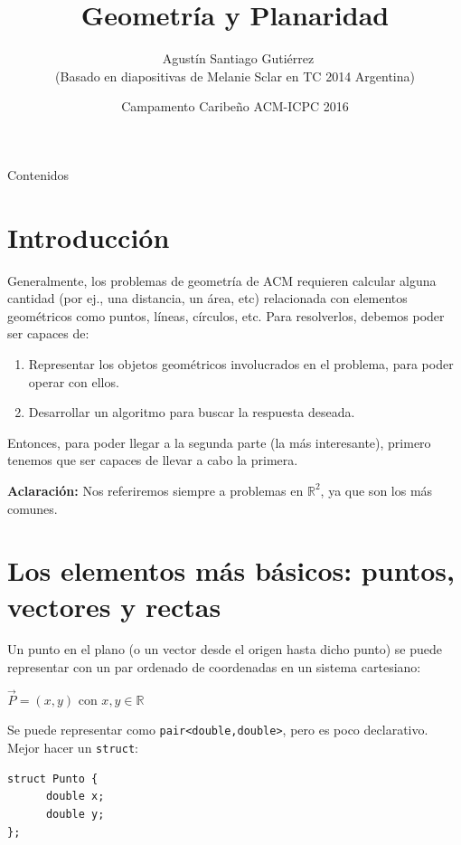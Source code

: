 \documentclass[compress]{beamer}
\title[Geometr\'ia Computacional] %
{Geometr\'ia y Planaridad}
\author[Agustín Gutiérrez] %
{~Agustín Santiago Gutiérrez \\ {\tiny (Basado en diapositivas de Melanie Sclar en TC 2014 Argentina)}}
\institute[UBA] %
{
  Facultad de Ciencias Exactas y Naturales\\
  Universidad de Buenos Aires
}
\date[CC 2016] %
{Campamento Caribeño ACM-ICPC 2016}
\begin{document}
\begin{frame}
  \titlepage
\end{frame}

\begin{frame}{Contenidos}
  \tableofcontents
\end{frame}

\section{Introducci\'on}
\begin{frame}

Generalmente, los problemas de geometr\'ia de ACM requieren calcular 
alguna cantidad (por ej., una distancia, un \'area, etc) relacionada con
elementos geom\'etricos como puntos, l\'ineas, c\'irculos, etc.
Para resolverlos, debemos poder ser capaces de:\\
\bigskip
\begin{enumerate}
\item Representar los objetos geom\'etricos involucrados en el problema, 
para poder operar con ellos.

\item Desarrollar un algoritmo para buscar la respuesta deseada.
\end{enumerate}

Entonces, para poder llegar a la segunda parte (la m\'as interesante), primero tenemos que ser capaces de llevar a cabo la primera.

\bigskip

\textbf{Aclaraci\'on:} Nos referiremos siempre a problemas en $\mathbb{R}^2$, ya que son los m\'as comunes.

\end{frame}

\section{Los elementos m\'as b\'asicos: puntos, vectores y rectas}
\begin{frame}[fragile]
Un punto en el plano (o un vector desde el origen hasta dicho punto) se puede representar con un par ordenado de coordenadas en un sistema cartesiano:

\begin{center}
$\vec{P} = (x,y)$ con $x,y \in \mathbb{R}$
\end{center}

\bigskip

Se puede representar como {\tt pair<double,double>}, pero es poco declarativo. Mejor hacer un {\tt struct}:

\begin{lstlisting}
struct Punto {
      double x;
      double y;
};
\end{lstlisting}

\end{frame}
\end{document}
